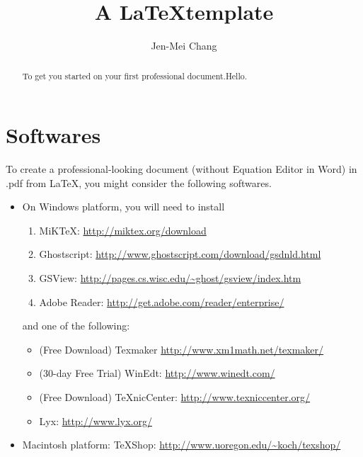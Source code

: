 \documentclass[11pt]{amsart}
\theoremstyle{plain}%
\theoremstyle{definition}
\theoremstyle{remark}
\numberwithin{equation}{section}
\begin{document}
\title[Crash Course in \LaTeX]{A \LaTeX template}
\author{Jen-Mei Chang}
\address{Department of Mathematics and Statistics\\
California State University, Long Beach\\
1250 Bellflower Blvd.\\
Long Beach, CA 90840-1001 \\
}


\begin{abstract}
To get you started on your first professional document.Hello.
\end{abstract}

\maketitle
\section{Softwares}
To create a professional-looking document (without Equation Editor in Word) in .pdf from \LaTeX, you might consider the following softwares.
\begin{itemize}
    \item On Windows platform, you will need to install
            \begin{enumerate}
                \item  MiKTeX: \url{http://miktex.org/download}
                \item Ghostscript: \url{http://www.ghostscript.com/download/gsdnld.html}
                \item  GSView: \url{http://pages.cs.wisc.edu/~ghost/gsview/index.htm}
                \item  Adobe Reader:  \url{http://get.adobe.com/reader/enterprise/}
            \end{enumerate}
                and one of the following:
            \begin{itemize}
                \item (Free Download) Texmaker \url{http://www.xm1math.net/texmaker/}
                \item (30-day Free Trial) WinEdt: \url{http://www.winedt.com/}
                \item  (Free Download) TeXnicCenter:  \url{http://www.texniccenter.org/}
                \item  Lyx: \url{http://www.lyx.org/}
            \end{itemize}

    \item Macintosh platform: TeXShop: \url{http://www.uoregon.edu/~koch/texshop/}
\end{itemize}
\end{document}
